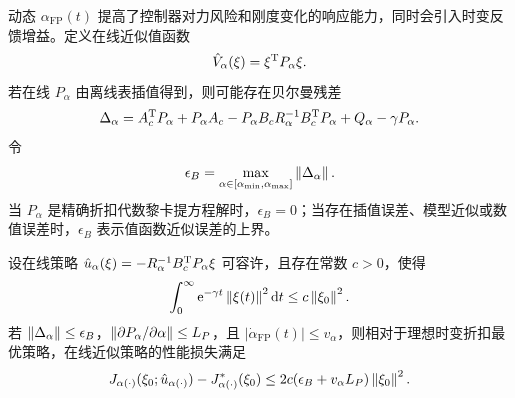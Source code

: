 动态 $\alpha_{\mathrm{FP}}(t)$ 提高了控制器对力风险和刚度变化的响应能力，同时会引入时变反馈增益。定义在线近似值函数
\begin{equation}
  \hat V_{\alpha}(\xi)=\xi^{\mathrm{T}}P_{\alpha}\xi .
  \label{eq:ch3_val_online}
\end{equation}
若在线 $P_\alpha$ 由离线表插值得到，则可能存在贝尔曼残差
\begin{equation}
  \Delta_\alpha=A_c^{\mathrm{T}}P_\alpha+P_\alpha A_c-P_\alpha B_cR_\alpha^{-1}B_c^{\mathrm{T}}P_\alpha+Q_\alpha-\gamma P_\alpha .
  \label{eq:ch3_bellman_residual}
\end{equation}
令
\begin{equation}
  \epsilon_B=\max_{\alpha\in[\alpha_{\min},\alpha_{\max}]}\left\lVert \Delta_\alpha\right\rVert.
  \label{eq:ch3_eps_B}
\end{equation}
当 $P_\alpha$ 是精确折扣代数黎卡提方程解时，$\epsilon_B=0$；当存在插值误差、模型近似或数值误差时，$\epsilon_B$ 表示值函数近似误差的上界。

\begin{theorem}[时变优先级下的性能损失上界]
\label{thm:ch3_timevarying_performance}
设在线策略 $\hat u_\alpha(\xi)=-R_\alpha^{-1}B_c^{\mathrm{T}}P_\alpha\xi$ 可容许，且存在常数 $c>0$，使得
\begin{equation}
  \int_0^\infty \mathrm{e}^{-\gamma t}\left\lVert \xi(t)\right\rVert^2\mathrm{d} t\le c\left\lVert \xi_0\right\rVert^2 .
\end{equation}
若 $\left\lVert \Delta_\alpha\right\rVert\le\epsilon_B$，$\left\lVert \partial P_\alpha/\partial\alpha\right\rVert\le L_P$，且 $|\dot\alpha_{\mathrm{FP}}(t)|\le v_\alpha$，则相对于理想时变折扣最优策略，在线近似策略的性能损失满足
\begin{equation}
  J_{\alpha(\cdot)}(\xi_0;\hat u_{\alpha(\cdot)})-J_{\alpha(\cdot)}^*(\xi_0)
  \le 2c(\epsilon_B+v_\alpha L_P)\left\lVert \xi_0\right\rVert^2 .
  \label{eq:ch3_perf_loss}
\end{equation}
\end{theorem}

